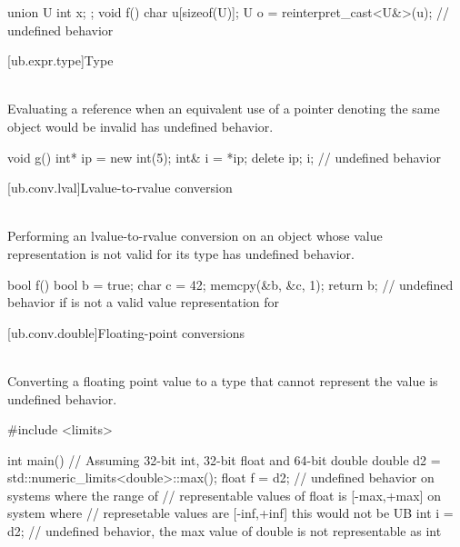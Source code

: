 {\pnum
\begin{example}
\begin{codeblock}
union U { int x; };
void f()
{
   char u[sizeof(U)];
   U o = reinterpret_cast<U&>(u);   // undefined behavior
}
\end{codeblock}
\end{example}

[ub.expr.type]{Type}

\pnum
{} \\
Evaluating a reference when an equivalent use of a pointer denoting the same object
would be invalid has undefined behavior.

\pnum
\begin{example}
\begin{codeblock}
void g()
{
  int* ip = new int(5);
  int& i = *ip;
  delete ip;
  i;    // undefined behavior
}
\end{codeblock}
\end{example}

[ub.conv.lval]{Lvalue-to-rvalue conversion}

\pnum
{} \\
Performing an
lvalue-to-rvalue conversion
on an object whose
value representation
is not valid for its type
has undefined behavior.

\pnum
\begin{example}
\begin{codeblock}
bool f() {
  bool b = true;
  char c = 42;
  memcpy(&b, &c, 1);
  return b;         // undefined behavior if  is not a valid value representation for 
}
\end{codeblock}
\end{example}


[ub.conv.double]{Floating-point conversions}

\pnum
{} \\
Converting a floating point value to a type that cannot represent the value is undefined behavior.

\pnum
\begin{example}
\begin{codeblock}
#include <limits>

int main() {
  // Assuming 32-bit int, 32-bit float and 64-bit double
  double d2 = std::numeric_limits<double>::max();
  float f = d2; // undefined behavior on systems where the range of
                // representable values of float is [-max,+max] on system where
                // represetable values are [-inf,+inf] this would not be UB
  int i = d2;   // undefined behavior, the max value of double is not representable as int
}
\end{codeblock}
\end{example}


}
